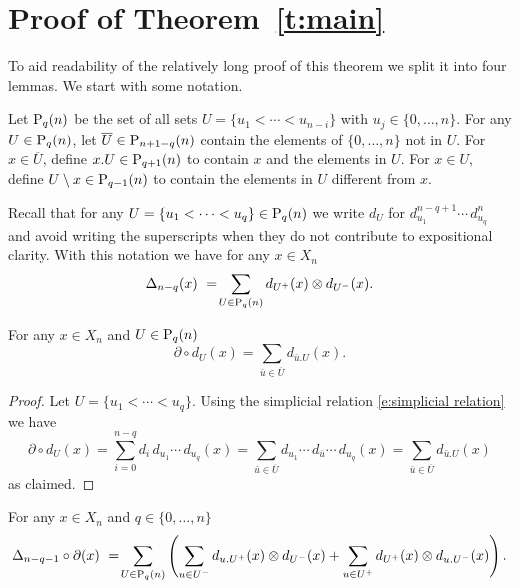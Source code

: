 
\section{Proof of Theorem~\ref{t:main}} \label{s:proof}

To aid readability of the relatively long proof of this theorem we split it into four lemmas.
We start with some notation.

\begin{definition}
	Let $\P_q(n)$ be the set of all sets $U = \{u_1 < \cdots < u_{n-i}\}$ with $u_j \in \{0, \dots, n\}$.
	For any $U \in \P_q(n)$, let $\overline{U} \in \P_{n+1-q}(n)$ contain the elements of $\{0, \dots, n\}$ not in $U$. For $x \in \overline{U}$, define $x.U \in \P_{q+1}(n)$ to contain $x$ and the elements in $U$.
	For $x \in U$, define $U \setminus x \in \P_{q-1}(n)$ to contain the elements in $U$ different from $x$.
\end{definition}

Recall that for any $U = \{u_1 < \cdots < u_q\} \in \P_q(n)$ we write $d_U$ for $d_{u_1}^{n-q+1} \cdots \,d_{u_q}^n$ and avoid writing the superscripts when they do not contribute to expositional clarity.
With this notation we have for any $x \in X_n$
\begin{equation*}
\Delta_{n-q}(x)\ =\! \sum_{U \in \P_q(n)} d_{U^+}(x) \otimes d_{U^-}(x).
\end{equation*}

\begin{lemma} \label{l:partial dU = dxU}
	For any $x \in X_n$ and $U \in \P_{q}(n)$
	\begin{equation} \label{lemma1: existence: eq1}
	\partial \circ d_U(x) = \sum_{\bar{u} \in \overline{U}} d_{\bar{u}.U}(x).
	\end{equation}
\end{lemma}

\begin{proof}
	Let $U = \{u_1 < \cdots < u_q\}$. Using the simplicial relation \eqref{e:simplicial relation} we have
	\begin{equation*}
	\partial \circ d_U(x) = 
	\sum_{i=0}^{n-q} d_i\, d_{u_1} \cdots\, d_{u_q}(x) = 
	\sum_{\bar{u} \in \overline{U}} d_{u_1} \cdots\, d_{\bar{u}} \cdots\, d_{u_q}(x) =
	\sum_{\bar{u} \in \overline{U}} d_{\bar{u}.U}(x)
	\end{equation*}
	as claimed.
\end{proof}


\begin{lemma} \label{l:pigeon hole}
	For any $x \in X_n$ and $q \in \{0, \dots, n\}$
	\begin{equation} \label{e:pigeon hole 1}
	\Delta_{n-q-1} \circ \partial (x)\ =\! 
	\sum_{U \in \P_q(n)} \left( 
	\sum_{u \in U^-} d_{u.U^+}(x) \tensor d_{U^-}(x) + 
	\sum_{u \in U^+} d_{U^+}(x) \tensor d_{u.U^-}(x) \right).
	\end{equation}
\end{lemma}

